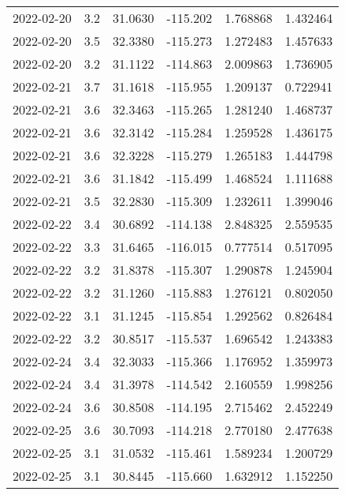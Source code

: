 \begin{tabular}{lrrrrr}
2022-02-20 &       3.2 &  31.0630 &  -115.202 &         1.768868 &         1.432464 \\
2022-02-20 &       3.5 &  32.3380 &  -115.273 &         1.272483 &         1.457633 \\
2022-02-20 &       3.2 &  31.1122 &  -114.863 &         2.009863 &         1.736905 \\
2022-02-21 &       3.7 &  31.1618 &  -115.955 &         1.209137 &         0.722941 \\
2022-02-21 &       3.6 &  32.3463 &  -115.265 &         1.281240 &         1.468737 \\
2022-02-21 &       3.6 &  32.3142 &  -115.284 &         1.259528 &         1.436175 \\
2022-02-21 &       3.6 &  32.3228 &  -115.279 &         1.265183 &         1.444798 \\
2022-02-21 &       3.6 &  31.1842 &  -115.499 &         1.468524 &         1.111688 \\
2022-02-21 &       3.5 &  32.2830 &  -115.309 &         1.232611 &         1.399046 \\
2022-02-22 &       3.4 &  30.6892 &  -114.138 &         2.848325 &         2.559535 \\
2022-02-22 &       3.3 &  31.6465 &  -116.015 &         0.777514 &         0.517095 \\
2022-02-22 &       3.2 &  31.8378 &  -115.307 &         1.290878 &         1.245904 \\
2022-02-22 &       3.2 &  31.1260 &  -115.883 &         1.276121 &         0.802050 \\
2022-02-22 &       3.1 &  31.1245 &  -115.854 &         1.292562 &         0.826484 \\
2022-02-22 &       3.2 &  30.8517 &  -115.537 &         1.696542 &         1.243383 \\
2022-02-24 &       3.4 &  32.3033 &  -115.366 &         1.176952 &         1.359973 \\
2022-02-24 &       3.4 &  31.3978 &  -114.542 &         2.160559 &         1.998256 \\
2022-02-24 &       3.6 &  30.8508 &  -114.195 &         2.715462 &         2.452249 \\
2022-02-25 &       3.6 &  30.7093 &  -114.218 &         2.770180 &         2.477638 \\
2022-02-25 &       3.1 &  31.0532 &  -115.461 &         1.589234 &         1.200729 \\
2022-02-25 &       3.1 &  30.8445 &  -115.660 &         1.632912 &         1.152250 \\

\end{tabular}

